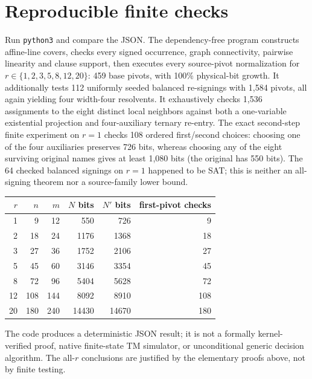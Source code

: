 \documentclass[10pt]{article}
\begin{document}
\section{Reproducible finite checks}
Run \texttt{python3}  and compare the JSON. The dependency-free program constructs affine-line covers, checks every signed occurrence, graph connectivity, pairwise linearity and clause support, then executes every source-pivot normalization for $r\in\{1,2,3,5,8,12,20\}$: 459 base pivots, with 100\% physical-bit growth. It additionally tests 112 uniformly seeded balanced re-signings with 1,584 pivots, all again yielding four width-four resolvents. It exhaustively checks 1,536 assignments to the eight distinct local neighbors against both a one-variable existential projection and four-auxiliary ternary re-entry. The exact second-step finite experiment on $r=1$ checks 108 ordered first/second choices: choosing one of the four auxiliaries preserves 726 bits, whereas choosing any of the eight surviving original names gives at least 1,080 bits (the original has 550 bits). The 64 checked balanced signings on $r=1$ happened to be SAT; this is neither an all-signing theorem nor a source-family lower bound.
\begin{center}
\begin{tabular}{rrrrrr}\toprule
$r$&$n$&$m$&$N$ bits&$N'$ bits&first-pivot checks\\\midrule
1&9&12&550&726&9\\
2&18&24&1176&1368&18\\
3&27&36&1752&2106&27\\
5&45&60&3146&3354&45\\
8&72&96&5404&5628&72\\
12&108&144&8092&8910&108\\
20&180&240&14430&14670&180\\\bottomrule
\end{tabular}
\end{center}
The code produces a deterministic JSON result; it is not a formally kernel-verified proof, native finite-state TM simulator, or unconditional generic decision algorithm. The all-$r$ conclusions are justified by the elementary proofs above, not by finite testing.
\end{document}
